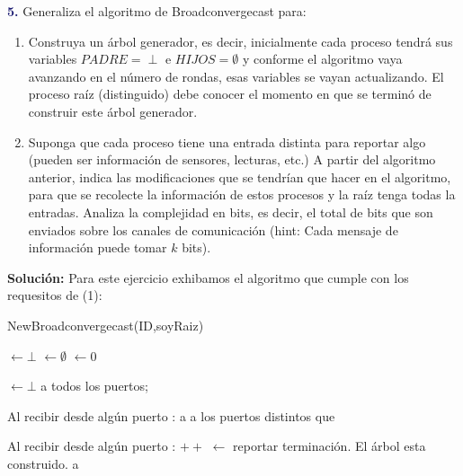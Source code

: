 \newpage
\textbf{\textcolor{MidnightBlue}{5.}}
Generaliza el algoritmo de Broadconvergecast para:
\begin{enumerate}
\item Construya un árbol generador, es decir,
inicialmente cada proceso tendrá sus variables
$PADRE = \perp$ e $HIJOS = \emptyset$ y conforme
el algoritmo vaya avanzando en el número de
rondas, esas variables se vayan actualizando.
El proceso raíz (distinguido) debe conocer el
momento en que se terminó de construir este árbol generador.

\item Suponga que cada proceso tiene una entrada
distinta para reportar algo (pueden ser información
de sensores, lecturas, etc.) A partir del algoritmo
anterior, indica las modificaciones que se tendrían
que hacer en el algoritmo, para que se recolecte la
información de estos procesos y la raíz tenga todas
la entradas. Analiza la complejidad en bits, es decir,
el total de bits que son enviados sobre los canales de
comunicación (hint: Cada mensaje de información puede
tomar $k$ bits).
\end{enumerate}

\textbf{Solución:}
Para este ejercicio exhibamos el algoritmo que cumple
con los requesitos de (1):

\begin{algorithm}
\caption{NewBroadconvergecast(ID,soyRaiz)}\label{alg:cap}
\begin{algorithmic}[1]
\State {} $\gets \bot$
\State {} $\gets \emptyset$
\State {} $\gets 0$

\State {}\;

    \State {} $\gets \bot$\;
    \State {} a todos los puertos;
\EndIf
{}

\State Al recibir  desde algún puerto :\;
    \State {}\;    
\EndIf
{}
    \State {} a 
\Else
    \State {} a los puertos distintos que 
\EndIf
{}

\State Al recibir  desde algún puerto :
\State {}$++$
\State {} $\gets$ 
        \State reportar terminación. El árbol esta construido.
     \Else
        \State {} a 
     \EndIf
\EndIf
\end{algorithmic}
\end{algorithm}

